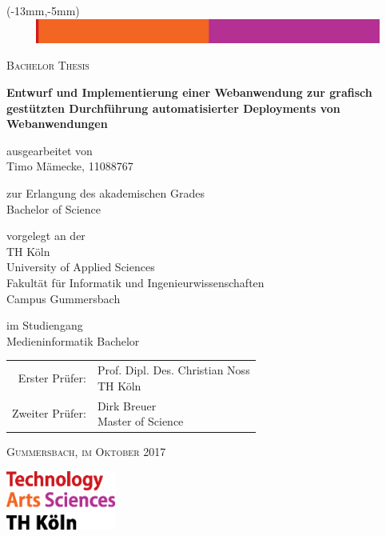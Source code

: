 \begin{titlepage}
  \enlargethispage{5cm}

  \begin{textblock*}{230mm}(-13mm,-5mm)
    \includegraphics[width=230mm,height=8mm]{./assets/topline.eps}
  \end{textblock*}


  \begin{center}
    \textsc{\Large{Bachelor Thesis}}

    \vspace{0.6cm}

    \LARGE{\textbf{Entwurf und Implementierung einer Webanwendung zur grafisch gestützten Durchführung automatisierter Deployments von Webanwendungen}}

    \vspace{0.6cm}

    \normalsize{ausgearbeitet von} \\
    \Large{Timo Mämecke, 11088767}

    \normalsize{zur Erlangung des akademischen Grades} \\
    \Large{Bachelor of Science}

    \normalsize{vorgelegt an der} \\
    \Large{TH Köln}\\
    \Large{University of Applied Sciences}\\
    \Large{Fakultät für Informatik und Ingenieurwissenschaften}\\
    \Large{Campus Gummersbach}

    \normalsize{im Studiengang} \\
    \Large{Medieninformatik Bachelor}

    \vspace{0.6cm}

    \large{
      \begin{tabular}{ r l }
        Erster Prüfer: & \makecell[lt]{Prof. Dipl. Des. Christian Noss\\\small{TH Köln}\vspace{0.2cm}} \\
        Zweiter Prüfer: & \makecell[lt]{Dirk Breuer\\\small{Master of Science}}
      \end{tabular}
    }

    \vspace{0.6cm}

    \textsc{Gummersbach, im Oktober 2017}

  \end{center}

  \begin{flushright}
    \includegraphics[height=55pt]{./assets/logo_th-koeln.eps}
  \end{flushright}
\end{titlepage}
